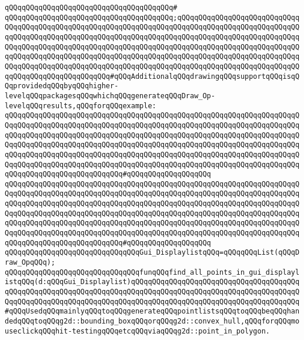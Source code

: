 \verb|qQQqqQQqqQQqqQQqqQQqqQQqqQQqqQQqqQQqqQQq#|\newline
\verb|qQQqqQQqqQQqqQQqqQQqqQQqqQQqqQQqqQQqqQQq;qQQqqQQqqQQqqQQqqQQqqQQqqQQqqQQqqQQqqQQqqQQqqQQqqQQqqQQqqQQqqQQqqQQqqQQqqQQqqQQqqQQqqQQqqQQqqQQqqQQqqQQqqQQqqQQqqQQqqQQqqQQqqQQqqQQqqQQqqQQqqQQqqQQqqQQqqQQqqQQqqQQqqQQqqQQqqQQqqQQqqQQqqQQqqQQqqQQqqQQqqQQqqQQqqQQqqQQqqQQqqQQqqQQqqQQqqQQqqQQqqQQqqQQqqQQqqQQqqQQqqQQqqQQqqQQqqQQqqQQqqQQqqQQqqQQqqQQqqQQqqQQqqQQqqQQqqQQqqQQqqQQqqQQqqQQqqQQqqQQqqQQqqQQqqQQqqQQqqQQqqQQqqQQqqQQqqQQqqQQqqQQqqQQqqQQqqQQqqQQqqQQq#qQQqAdditionalqQQqdrawingqQQqsupportqQQqisqQQqprovidedqQQqbyqQQqhigher-levelqQQqpackagesqQQqwhichqQQqgenerateqQQqDraw_Op-levelqQQqresults,qQQqforqQQqexample:|\newline
\verb|qQQqqQQqqQQqqQQqqQQqqQQqqQQqqQQqqQQqqQQqqQQqqQQqqQQqqQQqqQQqqQQqqQQqqQQqqQQqqQQqqQQqqQQqqQQqqQQqqQQqqQQqqQQqqQQqqQQqqQQqqQQqqQQqqQQqqQQqqQQqqQQqqQQqqQQqqQQqqQQqqQQqqQQqqQQqqQQqqQQqqQQqqQQqqQQqqQQqqQQqqQQqqQQqqQQqqQQqqQQqqQQqqQQqqQQqqQQqqQQqqQQqqQQqqQQqqQQqqQQqqQQqqQQqqQQqqQQqqQQqqQQqqQQqqQQqqQQqqQQqqQQqqQQqqQQqqQQqqQQqqQQqqQQqqQQqqQQqqQQqqQQqqQQqqQQqqQQqqQQqqQQqqQQqqQQqqQQqqQQqqQQqqQQqqQQqqQQqqQQqqQQqqQQqqQQqqQQqqQQqqQQqqQQqqQQqqQQqqQQqqQQqqQQq#qQQqqQQqqQQqqQQqqQQq|\newline
\verb|qQQqqQQqqQQqqQQqqQQqqQQqqQQqqQQqqQQqqQQqqQQqqQQqqQQqqQQqqQQqqQQqqQQqqQQqqQQqqQQqqQQqqQQqqQQqqQQqqQQqqQQqqQQqqQQqqQQqqQQqqQQqqQQqqQQqqQQqqQQqqQQqqQQqqQQqqQQqqQQqqQQqqQQqqQQqqQQqqQQqqQQqqQQqqQQqqQQqqQQqqQQqqQQqqQQqqQQqqQQqqQQqqQQqqQQqqQQqqQQqqQQqqQQqqQQqqQQqqQQqqQQqqQQqqQQqqQQqqQQqqQQqqQQqqQQqqQQqqQQqqQQqqQQqqQQqqQQqqQQqqQQqqQQqqQQqqQQqqQQqqQQqqQQqqQQqqQQqqQQqqQQqqQQqqQQqqQQqqQQqqQQqqQQqqQQqqQQqqQQqqQQqqQQqqQQqqQQqqQQqqQQqqQQqqQQqqQQqqQQqqQQqqQQq#qQQqqQQqqQQqqQQqqQQq|\newline
\newline
\verb|qQQqqQQqqQQqqQQqqQQqqQQqqQQqqQQqGui_DisplaylistqQQq=qQQqqQQqList(qQQqDraw_OpqQQq);|\newline
\newline
\newline
\verb|qQQqqQQqqQQqqQQqqQQqqQQqqQQqqQQqfunqQQqfind_all_points_in_gui_displaylistqQQq(d:qQQqGui_Displaylist)qQQqqQQqqQQqqQQqqQQqqQQqqQQqqQQqqQQqqQQqqQQqqQQqqQQqqQQqqQQqqQQqqQQqqQQqqQQqqQQqqQQqqQQqqQQqqQQqqQQqqQQqqQQqqQQqqQQqqQQqqQQqqQQqqQQqqQQqqQQqqQQqqQQqqQQqqQQqqQQqqQQqqQQqqQQqqQQqqQQq#qQQqUsedqQQqmainlyqQQqtoqQQqgenerateqQQqpointlistsqQQqtoqQQqbeqQQqhandedqQQqtoqQQqg2d::bounding_boxqQQqorqQQqg2d::convex_hull,qQQqforqQQqmouseclickqQQqhit-testingqQQqetcqQQqviaqQQqg2d::point_in_polygon.|\newline
